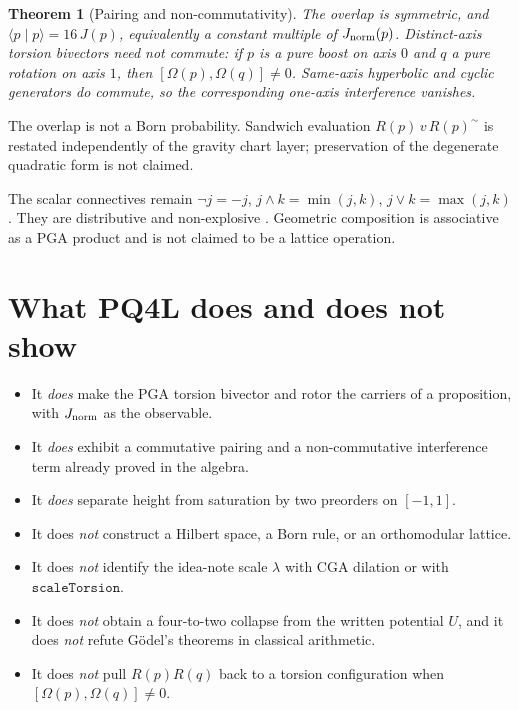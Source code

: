 \documentclass[dvipdfmx,11pt,a4paper]{article}
\newtheorem{theorem}{Theorem}[section]
\theoremstyle{definition}
\theoremstyle{remark}
\newcommand{\Jnorm}{J_{\rm norm}}
\begin{document}
\begin{theorem}[Pairing and non-commutativity]
\label{thm:geo}
The overlap is symmetric, and \(\langle p\mid p\rangle=16\,J(p)\),
equivalently a constant multiple of \(\Jnorm(p)\). Distinct-axis
torsion bivectors need not commute: if \(p\) is a pure boost on axis
\(0\) and \(q\) a pure rotation on axis \(1\), then
\([\Omega(p),\Omega(q)]\ne 0\). Same-axis hyperbolic and cyclic
generators do commute, so the corresponding one-axis interference
vanishes.
\end{theorem}

The overlap is not a Born probability. Sandwich evaluation
\(R(p)\,v\,R(p)^\sim\) is restated independently of the gravity chart
layer; preservation of the degenerate quadratic form is not claimed.

The scalar connectives remain \(\neg j=-j\), \(j\wedge k=\min(j,k)\),
\(j\vee k=\max(j,k)\). They are distributive and non-explosive
\cite{D4L2026}. Geometric composition is associative as a PGA product
and is not claimed to be a lattice operation.

\section{What PQ4L does and does not show}

\begin{itemize}[leftmargin=1.4em]
  \item It \emph{does} make the PGA torsion bivector and rotor the
        carriers of a proposition, with \(\Jnorm\) as the observable.
  \item It \emph{does} exhibit a commutative pairing and a
        non-commutative interference term already proved in the
        algebra.
  \item It \emph{does} separate height from saturation by two
        preorders on \([-1,1]\).
  \item It does \emph{not} construct a Hilbert space, a Born rule, or
        an orthomodular lattice.
  \item It does \emph{not} identify the idea-note scale \(\lambda\)
        with CGA dilation or with \(\texttt{scaleTorsion}\).
  \item It does \emph{not} obtain a four-to-two collapse from the
        written potential \(U\), and it does \emph{not} refute
        G\"odel's theorems in classical arithmetic.
  \item It does \emph{not} pull \(R(p)R(q)\) back to a torsion
        configuration when \([\Omega(p),\Omega(q)]\ne 0\).
\end{itemize}
\end{document}
